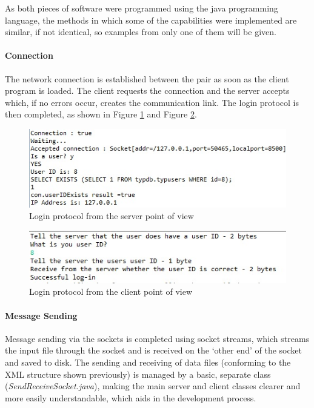 \documentclass[a4paper,12pt]{report}
\begin{document}
As both pieces of software were programmed using the java programming language, the methods in which some of the capabilities were implemented are similar, if not identical, so examples from only one of them will be given. 

\paragraph{Connection}

The network connection is established between the pair as soon as the client program is loaded. The client requests the connection and the server accepts which, if no errors occur, creates the communication link. The login protocol is then completed, as shown in Figure \ref{fig:serverlogin} and Figure \ref{fig:clientlogin}. 

\begin{figure}[htb]
 \centering
 \includegraphics[scale=0.8]{images/screenshots/scloginserver.jpg}
 \caption{Login protocol from the server point of view}
 \label{fig:serverlogin}
\end{figure}

\begin{figure}[htb]
 \centering
 \includegraphics[scale=0.8]{images/screenshots/scloginclient.jpg}
 \caption{Login protocol from the client point of view}
 \label{fig:clientlogin}
\end{figure}

\paragraph{Message Sending}

Message sending via the sockets is completed using socket streams, which streams the input file through the socket and is received on the ‘other end’ of the socket and saved to disk. The sending and receiving of data files (conforming to the XML structure shown previously) is managed by a basic, separate class (\textit{SendReceiveSocket.java}), making the main server and client classes clearer and more easily understandable, which aids in the development process. 
\end{document}
